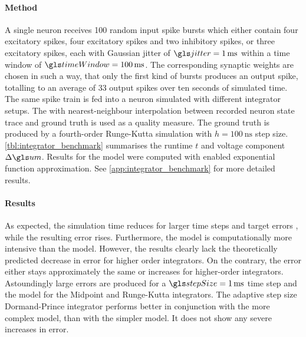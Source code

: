 \paragraph{Method}
A single neuron receives 100 random input spike bursts which either contain four excitatory spikes, four excitatory spikes and two inhibitory spikes, or three excitatory spikes, each with Gaussian jitter of $\jitter = \SI{1}{\milli\second}$ within a time window of $\timeWindow = \SI{100}{\milli\second}$. The corresponding synaptic weights are chosen in such a way, that only the first kind of bursts produces an output spike, totalling to an average of 33 output spikes over ten seconds of simulated time. The same spike train is fed into a neuron simulated with different integrator setups. The \RMSE with nearest-neighbour interpolation between recorded neuron state trace and ground truth is used as a quality measure. The ground truth is produced by a fourth-order Runge-Kutta simulation with $h = \SI{100}{\nano\second}$ step size. \cref{tbl:integrator_benchmark} summarises the runtime $t$ and voltage component \RMSE $\Delta \um$.
Results for the \AdEx model were computed with enabled exponential function
approximation. See \cref{app:integrator_benchmark} for more detailed results.

\paragraph{Results}
As expected, the simulation time reduces for larger time steps \stepSize and target errors \targetErr, while the resulting error rises. Furthermore, the \AdEx model is computationally more intensive than the \LIF model. However, the results clearly lack the theoretically predicted decrease in error for higher order integrators. On the contrary, the error either stays approximately the same or increases for higher-order integrators. Astoundingly large errors are produced for a $\stepSize = \SI{1}{\milli\second}$ time step and the \AdEx model for the Midpoint and Runge-Kutta integrators. The adaptive step size Dormand-Prince integrator performs better in conjunction with the more complex \AdEx model, than with the simpler \LIF model. It does not show any severe increases in error.

